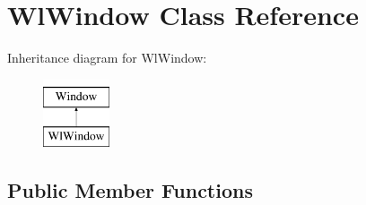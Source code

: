 \hypertarget{classWlWindow}{}\section{Wl\+Window Class Reference}
\label{classWlWindow}
Inheritance diagram for Wl\+Window\+:\begin{figure}[H]
\begin{center}
\leavevmode
\includegraphics[height=2.000000cm]{classWlWindow}
\end{center}
\end{figure}
\subsection*{Public Member Functions}
